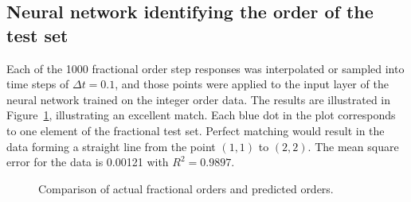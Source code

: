 \subsection{Neural network identifying the order of the test set}

Each of the 1000 fractional order step responses was interpolated or sampled
into time steps of $\Delta t = 0.1$, and those points were applied to the input
layer of the neural network trained on the integer order data. The results are
illustrated in Figure~\ref{fig:accuracy}, illustrating an excellent match. Each
blue dot in the plot corresponds to one element of the fractional test set.
Perfect matching would result in the data forming a straight line from the point
$(1,1)$ to $(2,2)$. The mean square error for the data is 0.00121 with $R^2 =
0.9897$. 

\begin{figure}
\centering

\vspace*{-5pt}
\caption{Comparison of actual fractional orders and predicted orders.}
\label{fig:accuracy}
\end{figure}


